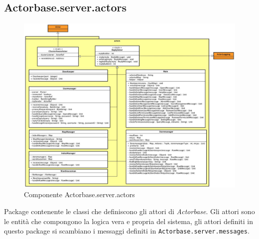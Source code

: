 \documentclass[a4paper]{article}
\begin{document}
	\subsection{Actorbase.server.actors}
		\begin{figure}[H]
			\centering
			\includegraphics[width=\textwidth]{Server/actorsLevel.jpg}
			\caption{Componente Actorbase.server.actors}
		\end{figure}
		Package contenente le classi che definiscono gli attori di \emph{Actorbase}. Gli attori sono le entità che compongono la logica vera e propria del sistema, gli attori definiti in questo package si scambiano i messaggi definiti in \texttt{Actorbase.server.messages}.
		
\end{document}
